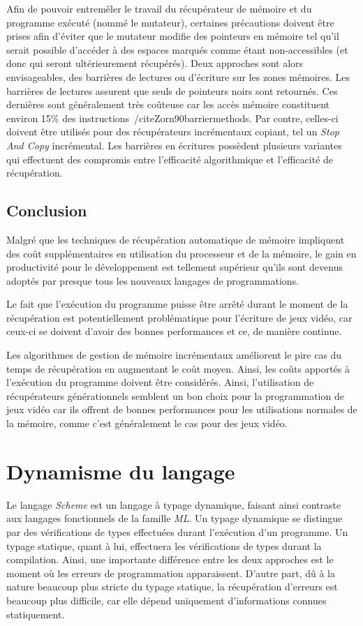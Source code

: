 \documentclass[12pt,twoside,letterpaper,francais]{book}
\newcommand{\Schemelang}{{\textit{Scheme }}}
\begin{document}
Afin de pouvoir entremêler le travail du récupérateur de mémoire et du
programme exécuté (nommé le mutateur), certaines précautions doivent
être prises afin d'éviter que le mutateur modifie des pointeurs en
mémoire tel qu'il serait possible d'accéder à des espaces marqués
comme étant non-accessibles (et donc qui seront ultérieurement
récupérés). Deux approches sont alors envisageables, des barrières de
lectures ou d'écriture sur les zones mémoires. Les barrières de
lectures assurent que seuls de pointeurs noirs sont retournés. Ces
dernières sont généralement très coûteuse car les accès mémoire
constituent environ 15\% des
instructions~/cite{Zorn90barriermethods}. Par contre, celles-ci
doivent être utilisés pour des récupérateurs incrémentaux copiant, tel
un \textit{Stop And Copy} incrémental. Les barrières en écritures
possèdent plusieurs variantes qui effectuent des compromis entre
l'efficacité algorithmique et l'efficacité de récupération. 


\FloatBarrier
\subsection{Conclusion}
Malgré que les techniques de récupération automatique de mémoire
impliquent des coût supplémentaires en utilisation du processeur et de
la mémoire, le gain en productivité pour le développement est
tellement supérieur qu'ils sont devenus adoptés par presque tous les
nouveaux langages de programmations.

Le fait que l'exécution du programme puisse être arrêté durant le
moment de la récupération est potentiellement problématique pour
l'écriture de jeux vidéo, car ceux-ci se doivent d'avoir des bonnes
performances et ce, de manière continue. 

Les algorithmes de gestion de mémoire incrémentaux améliorent le pire
cas du temps de récupération en augmentant le coût moyen. Ainsi, les
coûts apportés à l'exécution du programme doivent être
considérés. Ainsi, l'utilisation de récupérateurs générationnels
semblent un bon choix pour la programmation de jeux vidéo car ils
offrent de bonnes performances pour les utilisations normales de la
mémoire, comme c'est généralement le cas pour des jeux vidéo.


\FloatBarrier
\section{Dynamisme du langage}
Le langage \Schemelang est un langage à typage dynamique, faisant ainsi
contraste aux langages fonctionnels de la famille \textit{ML}. Un
typage dynamique se distingue par des vérifications de types
effectuées durant l'exécution d'un programme. Un typage statique,
quant à lui, effectuera les vérifications de types durant la
compilation. Ainsi, une importante différence entre les deux approches
est le moment où les erreurs de programmation apparaissent. D'autre
part, dû à la nature beaucoup plus stricte du typage statique, la
récupération d'erreurs est beaucoup plus difficile, car elle dépend
uniquement d'informations connues statiquement.
\end{document}
